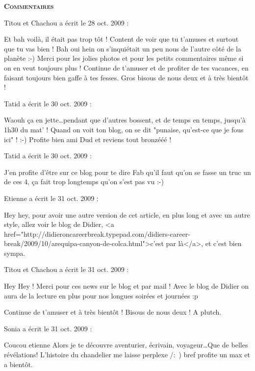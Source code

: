 \bigskip
\textbf{\textsc{Commentaires}}

\medskip
Titou et Chachou a écrit le 28 oct. 2009 :
\begin{displayquote}
Et bah voilà, il était pas trop tôt ! Content de voir que tu t'amuses et surtout que tu vas bien ! Bah oui hein on s'inquiétait un peu nous de l'autre côté de la planète :-)
Merci pour les jolies photos et pour les petits commentaires même si on en veut toujours plus !
Continue de t'amuser et de profiter de tes vacances, en faisant toujours bien gaffe à tes fesses.
Gros bisous de nous deux et à très bientôt !
\end{displayquote}

\medskip
Tatid a écrit le 30 oct. 2009 :
\begin{displayquote}
Waouh ça en jette\dots pendant que d'autres bossent, et de temps en temps, jusqu'à 1h30 du mat' ! Quand on voit ton blog, on se dit "punaise, qu'est-ce que je fous ici" ! :-)
Profite bien ami Dud et reviens tout bronzééé !
\end{displayquote}

\medskip
Tatid a écrit le 30 oct. 2009 :
\begin{displayquote}
J'en profite d'être sur ce blog pour te dire Fab qu'il faut qu'on se fasse un truc un de ces 4, ça fait trop longtemps qu'on s'est pas vu :-)
\end{displayquote}

\medskip
Etienne a écrit le 31 oct. 2009 :
\begin{displayquote}
Hey hey, pour avoir une autre version de cet article, en plus long et avec un autre style, allez voir le blog de Didier, <a href="http://didieroncareerbreak.typepad.com/didiers-career-break/2009/10/arequipa-canyon-de-colca.html">c'est par là</a>, et c'est bien sympa.
\end{displayquote}

\medskip
Titou et Chachou a écrit le 31 oct. 2009 :
\begin{displayquote}
Hey Hey ! Merci pour ces news sur le blog et par mail ! Avec le blog de Didier on aura de la lecture en plus pour nos longues soirées et journées :p

Continue de t'amuser et à très bientôt !
Bisous de nous deux !
A plutch.
\end{displayquote}

\medskip
Sonia a écrit le 31 oct. 2009 :
\begin{displayquote}
Coucou etienne
Alors je te découvre aventurier, écrivain, voyageur\dots Que de belles révélations!
L'histoire du chandelier me laisse perplexe /:~)
bref profite un max et a bientôt.
\end{displayquote}

